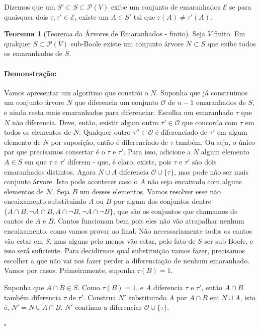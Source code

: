 \documentclass[11pt]{article}
\newcommand{\pulinho}{\vspace{.5cm}}
\theoremstyle{definition}
\newtheorem{theorem}{Teorema}
\newenvironment{teorema}{
\definecolor{shadecolor}{HTML}{f59aa3}
\begin{shaded}
\begin{theorem}
}
{
\end{theorem}
\end{shaded}
}
\theoremstyle{definition}
\theoremstyle{definition}
\theoremstyle{definition}
\theoremstyle{definition}
\theoremstyle{definition}
\theoremstyle{definition}
\theoremstyle{definition}
\newtheorem*{definition*}{Definição}
\newenvironment{definicao*}{
\definecolor{shadecolor}{HTML}{defcfc}
\begin{shaded}
\begin{definition*}
}
{
\end{definition*}
\end{shaded}
}
\theoremstyle{definition}
\theoremstyle{definition}
\theoremstyle{definition}
\theoremstyle{definition}
\newenvironment{prova}{\paragraph{Demonstração:}}{\hfill$\square$ 
\pulinho
}
\theoremstyle{definition}
\begin{document}
\begin{definicao*}
  Dizemos que um $S' \subset S \subset \mathcal{P}(V)$ exibe um conjunto de emaranhados $\mathcal{E}$ se para quaisquer dois $\tau, \tau' \in \mathcal{E}$, existe um $A \in S'$ tal que $\tau(A) \neq \tau'(A)$.
\end{definicao*}
\begin{teorema}[Teorema da Árvores de Emaranhados - finito]
  Seja $V$ finito. Em qualquer $S \subset \mathcal{P}(V)$ sub-Boole existe um conjunto árvore $N \subset S$ que exibe todos os emaranhados de $S$.
\end{teorema}
\begin{prova}
Vamos apresentar um algoritmo que constrói o $N$. Suponha que já construimos um conjunto árvore $N$ que diferencia um conjunto $\mathcal{O}$ de $n -1$ emaranhados de $S$, e ainda resta mais emaranhados para diferenciar. Escolha um emaranhado $\tau$ que $N$ não diferencia. Deve, então, existir algum outro $\tau' \in \mathcal{O}$ que concorda com $\tau$ em todos os elementos de $N$. Qualquer outro $\tau'' \in \mathcal{O}$ é diferenciado de $\tau'$ em algum elemento de $N$ por suposição, então é diferenciado de $\tau$ também. Ou seja, o único par que precisamos consertar é o $\tau$ e $\tau'$. Para isso, adicione a $N$ algum elemento $A \in S$ em que $\tau$ e $\tau'$ diferem - que, é claro, existe, pois $\tau$ e $\tau'$ são dois emaranhados distintos. Agora $N \cup {A}$ diferencia $\mathcal{O} \cup \{\tau\}$, mas pode não ser mais conjunto árvore. Isto pode acontecer caso o $A$ não seja encaixado com alguns elementos de $\mathcal{N}$. Seja $B$ um desses elementos. Vamos resolver esse não encaixamento substituindo $A$ ou $B$ por algum dos conjuntos dentre $\{A \cap B, \lnot A \cap B, A \cap \lnot B, \lnot A \cap \lnot B\}$, que são os conjuntos que chamamos de cantos de $A$ e $B$. Cantos funcionam bem pois eles não vão atrapalhar nenhum encaixamento, como vamos provar ao final. Não necessariamente todos os cantos vão estar em $S$, mas alguns pelo menos vão estar, pelo fato de $S$ ser sub-Boole, e isso será suficiente.  Para decidirmos qual substituição vamos fazer, precisamos escolher a que não vai nos fazer perder a diferenciação de nenhum emaranhado. Vamos por casos. Primeiramente, suponha $\tau(B) = 1$.

Suponha que $A \cap B \in S$. Como $\tau(B) = 1$, e $A$ diferencia $\tau$ e $\tau'$, então $A \cap B$ também diferencia $\tau$ de $\tau'$. Construa $N'$ substituindo $A$ por $A\cap B$ em $N \cup {A}$, isto é, $N' = N \cup {A \cap B}$. $N'$ continua a diferenciar $\mathcal{O} \cup \{\tau\}$.


\end{prova}
\end{document}
